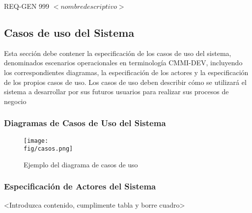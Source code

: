\begin{Artefacto}[H]
\begin{tabular}{|p{3cm}|p{10cm}|}
    \end{tabular}
\caption{REQ-GEN 999	$<nombre descriptivo>$ }
  \end{Artefacto}



\subsection{Casos de uso del Sistema}
\begin{textoazul}
 Esta sección debe contener la especificación de los casos de uso del sistema, denominados escenarios operacionales en terminología CMMI-DEV, incluyendo los correspondientes diagramas, la especificación de los actores y la especificación de los propios casos de uso. Los casos de uso deben describir cómo se utilizará el sistema a desarrollar por sus futuros usuarios para realizar sus procesos de negocio
\end{textoazul} 
 
\subsubsection{Diagramas de Casos de Uso del Sistema}

 
  \begin{figure}[H]
\centering
\texttt{[image: \\fig/casos.png]}
\caption{Ejemplo del diagrama de casos de uso}
\end{figure}



\subsubsection{Especificación de Actores del Sistema}
<Introduzca contenido, cumplimente tabla y borre cuadro>

